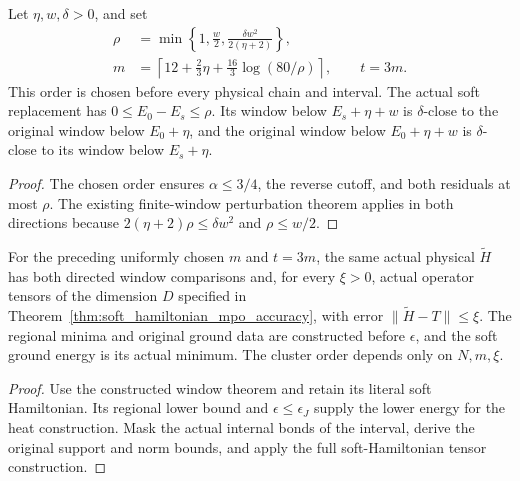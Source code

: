 \begin{lemma}
    \label{thm:interval_physical_scaled_soft_windows}
    \leanok
    Let $\eta,w,\delta>0$, and set
    \begin{align*}
        \rho & =\min\left\{1,\frac w2,
        \frac{\delta w^2}{2(\eta+2)}\right\}, \\
        m    & =\left\lceil12+\frac23\eta+
        \frac{16}{3}\log(80/\rho)\right\rceil,
        \qquad t=3m.
    \end{align*}
    This order is chosen before every physical chain and interval.
    The actual soft replacement has $0\leq E_0-E_s\leq\rho$.
    Its window below $E_s+\eta+w$ is $\delta$-close to the original
    window below $E_0+\eta$, and the original window below
    $E_0+\eta+w$ is $\delta$-close to its window below $E_s+\eta$.
\end{lemma}
\begin{proof}\leanok
    The chosen order ensures $\alpha\leq3/4$, the reverse cutoff,
    and both residuals at most $\rho$. The existing finite-window
    perturbation theorem applies in both directions because
    $2(\eta+2)\rho\leq\delta w^2$ and $\rho\leq w/2$.
\end{proof}

\begin{theorem}
    \label{thm:physical_soft_windows_and_mpo}
    \leanok
    For the preceding uniformly chosen $m$ and $t=3m$, the same
    actual physical $\widetilde H$ has both directed window
    comparisons and, for every $\xi>0$, actual operator tensors
    of the dimension $D$ specified in
    Theorem~\ref{thm:soft_hamiltonian_mpo_accuracy}, with error
    $\|\widetilde H-T\|\leq\xi$.
    The regional minima and original ground data are constructed
    before $\epsilon$, and the soft ground energy is its actual
    minimum. The cluster order depends only on $N,m,\xi$.
\end{theorem}
\begin{proof}\leanok
    Use the constructed window theorem and retain its literal
    soft Hamiltonian. Its regional lower bound and
    $\epsilon\leq\epsilon_J$ supply the lower energy for the heat
    construction. Mask the actual internal bonds of the interval,
    derive the original support and norm bounds, and apply the
    full soft-Hamiltonian tensor construction.
\end{proof}

